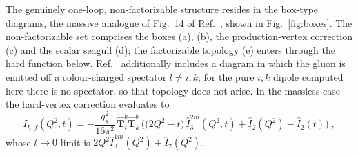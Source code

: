 \documentclass[11pt,a4paper]{article}
\newcommand{\Top}[1]{\hat{\mathbf{T}}_{#1}}
\newcommand{\Ihat}{\hat{I}}
\begin{document}
The genuinely one-loop, non-factorizable structure resides in the box-type
diagrams, the massive analogue of Fig.~14 of Ref.~\cite{Campbell:2025}, shown in
Fig.~\ref{fig:boxes}. The non-factorizable set comprises the boxes (a), (b), the
production-vertex correction (c) and the scalar seagull (d); the factorizable
topology (e) enters through the hard function below.
Ref.~\cite{Campbell:2025} additionally includes a diagram in which the gluon is
emitted off a colour-charged spectator $l\neq i,k$; for the pure $i,k$ dipole
computed here there is no spectator, so that topology does not arise. In the massless case the
hard-vertex correction evaluates to
\begin{equation}
  I_{h,f}(Q^2,t)=-\frac{g_s^2}{16\pi^2}\,\Top{i}^b\Top{k}^b\,
  \Big(\big(2Q^2-t\big)\,\Ihat_3^{2m}(Q^2,t)+\Ihat_2(Q^2)-\Ihat_2(t)\Big)\;,
  \label{eq:hardvertex}
\end{equation}
whose $t\to0$ limit is $2Q^2\Ihat_3^{1m}(Q^2)+\Ihat_2(Q^2)$.
\end{document}
